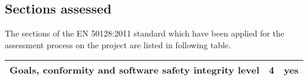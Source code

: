 \subsection{Sections assessed}\label{sec:sections-assessed}
The sections of the EN 50128:2011 standard which have been applied for the assessment process on the project are listed in following table.



\begin{supertabular}{| m{6cm} | m{2cm} | m{2cm} |}
	Goals, conformity and software safety integrity level & 4 & yes\\\hline


	 
\end{supertabular} 

\bigskip
\bigskip